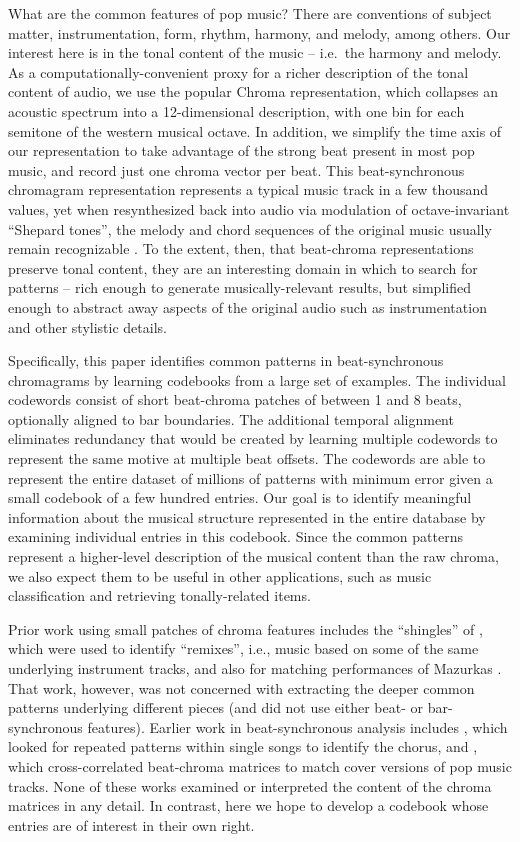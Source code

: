 \documentclass{article}
\newcommand{\ie}{i.e.~}
\begin{document}
What are the common features of pop music?  There are conventions
of subject matter, instrumentation, form, rhythm, harmony, and melody, among
others.  Our interest here is in the tonal content of the music -- \ie the
harmony and melody.  As a computationally-convenient proxy for a richer
description of the tonal content of audio, we use the popular Chroma
representation, which collapses an acoustic spectrum into a 12-dimensional
description, with one bin for each semitone of the western musical octave.
In addition, we simplify the time axis of our representation to take advantage
of the strong beat present in most pop music, and record just one
chroma vector per beat.  This beat-synchronous chromagram
representation represents a typical music track
in a few thousand values, yet when resynthesized back into audio via
modulation of octave-invariant ``Shepard tones'', the melody and
chord sequences of the original music usually remain recognizable
\cite{Ellis2007a_small}.  To the extent, then, that beat-chroma
representations preserve tonal content, they
are an interesting domain in which to search for patterns -- rich enough
to generate musically-relevant results, but simplified enough to
abstract away aspects of the original audio such as
instrumentation and other stylistic details.

Specifically, this paper identifies common patterns in beat-synchronous
chromagrams by learning codebooks from a large set of examples.
The individual codewords consist of short beat-chroma patches of
between 1 and 8 beats, optionally aligned to bar boundaries.
%
The additional temporal alignment eliminates redundancy that would be
created by learning multiple codewords to represent the same motive at
multiple beat offsets.
%
The codewords are able to represent the entire dataset
of millions of patterns with minimum error given a small codebook of
a few hundred entries.
%
Our goal is to identify meaningful information
about the musical structure represented in the entire database by
examining individual entries in this codebook.  Since the common
patterns represent a higher-level description of the musical content
than the raw chroma,
we also expect them to be useful in other applications, such as
music classification and retrieving tonally-related items.

Prior work using small patches of chroma features includes
the ``shingles'' of \cite{Casey2007_small}, which were used to
identify ``remixes'', i.e., music based on some of the same
underlying instrument tracks, and also for matching
performances of Mazurkas \cite{Casey2008}.  That work,
however, was not concerned with extracting the deeper
common patterns underlying different pieces (and did not
use either beat- or bar-synchronous features).  Earlier work in
beat-synchronous analysis includes \cite{Bartsch2001_small},
which looked for repeated patterns within single songs to
identify the chorus, and \cite{Ellis2007a_small}, which 
cross-correlated beat-chroma matrices to match cover
versions of pop music tracks.  None of these works
examined or interpreted the content of the chroma
matrices in any detail.  In contrast, here we hope to
develop a codebook whose entries are of interest
in their own right.
\end{document}
